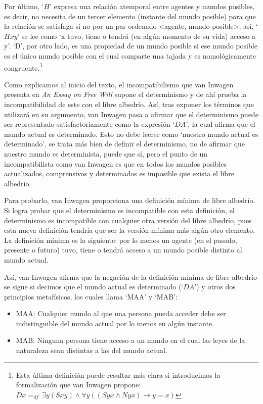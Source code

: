 \documentclass[12pt]{article} %
\begin{document}
Por último, `$H$' expresa una relación atemporal entre agentes y mundos posibles, es decir, no necesita de un tercer elemento (instante del mundo posible) para que la relación se satisfaga si no por un par ordenado <agente, mundo posible>, así, `$Hxy$' se lee como ‘x tuvo, tiene o tendrá (en algún momento de su vida) acceso a y’. ‘D’, por otro lado, es una propiedad de un mundo posible si ese mundo posible es el único mundo posible con el cual comparte una tajada y es nomológicamente congruente.\footnote{Esta última definición puede resultar más clara si introducimos la formalización que van Inwagen propone: $Dx = _{df} \, \exists y (Sxy) \land \forall y ((Syx \land Nyx) \rightarrow y = x)$}

Como explicamos al inicio del texto, el incompatibilismo que van Inwagen presenta en \textit{An Essay on Free Will} supone el determinismo y de ahí prueba la incompatibilidad de este con el libre albedrío. Así, tras exponer los términos que utilizará en su argumento, van Inwagen pasa a afirmar que el determinismo puede ser representado satisfactoriamente como la expresión `$DA$', la cual afirma que el mundo actual es determinado. Esto no debe leerse como ‘nuestro mundo actual es determinado’, se trata más bien de definir el determinismo, no de afirmar que nuestro mundo es determinista, puede que sí, pero el punto de un incompatibilista como van Inwagen es que en todos los mundos posibles actualizados, comprensivos y determinados es imposible que exista el libre albedrío.

Para probarlo, van Inwagen proporciona una definición mínima de libre albedrío. Si logra probar que el determinismo es incompatible con esta definición, el determinismo es incompatible con cualquier otra versión del libre albedrío, pues esta nueva definición tendría que ser la versión mínima más algún otro elemento. La definición mínima es la siguiente: por lo menos un agente (en el pasado, presente o futuro) tuvo, tiene o tendrá acceso a un mundo posible distinto al mundo actual.

Así, van Inwagen afirma que la negación de la definición mínima de libre albedrío se sigue si decimos que el mundo actual es determinado (`$DA$') y otros dos principios metafísicos, los cuales llama `MAA' y `MAB':
\begin{itemize}
	\item MAA: Cualquier mundo al que una persona pueda acceder debe ser indistinguible del mundo actual por lo menos en algún instante.
	\item MAB: Ninguna persona tiene acceso a un mundo en el cual las leyes de la naturaleza sean distintas a las del mundo actual.
\end{itemize}
\end{document}
